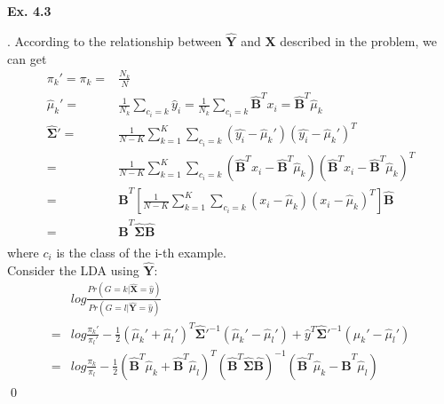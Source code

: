 \documentclass[12pt]{article}
\newenvironment{sol}
  {\par\vspace{3mm}\noindent{\it Solution}.}
  {\qed}
\begin{document}
\\
\\
\\
\\
\\
\\
\\
\\
\\
\\
\\
\\
\begin{flushleft}
\textbf{Ex. 4.3}
\end{flushleft}
\begin{sol}
According to the relationship between $\mathbf{\hat{Y}}$ and $\mathbf{X}$ described in the problem, we can get
\begin{equation*}
\begin{split}
\pi_k'=\pi_k=&\frac{N_k}{N}\\
\hat{\mu}_k'=&\frac{1}{N_k}\sum_{c_i=k}\hat{y}_i=\frac{1}{N_k}\sum_{c_i=k}\hat{\mathbf{B}}^Tx_i=\hat{\mathbf{B}}^T\hat{\mu}_k\\
\hat{\mathbf{\Sigma}}' = &\frac{1}{N-K}\sum_{k=1}^K\sum_{c_i=k}(\hat{y_i}-\hat{\mu}_k')(\hat{y_i}-\hat{\mu}_k')^T\\
=&\frac{1}{N-K}\sum_{k=1}^K\sum_{c_i=k}(\hat{\mathbf{B}}^Tx_i-\hat{\mathbf{B}}^T\hat{\mu}_k)(\hat{\mathbf{B}}^Tx_i-\hat{\mathbf{B}}^T\hat{\mu}_k)^T\\
=&\hat{\mathbf{B}}^T\left[\frac{1}{N-K}\sum_{k=1}^K\sum_{c_i=k}(x_i-\hat{\mu}_k)(x_i-\hat{\mu}_k)^T\right]\hat{\mathbf{B}}\\
=&\hat{\mathbf{B}}^T\hat{\mathbf{\Sigma}}\hat{\mathbf{B}}\\
\end{split}
\end{equation*}
where $c_i$ is the class of the i-th example.\\
Consider the LDA using $\hat{\mathbf{Y}}$:
\begin{equation*}
\begin{split}
&log\frac{Pr(G=k|\hat{\mathbf{X}}=\hat{y})}{Pr(G=l|\hat{\mathbf{Y}}=\hat{y})}\\
=&log\frac{\pi_k'}{\pi_l'}-\frac{1}{2}(\hat{\mu}_k'+\hat{\mu}_l')^T\hat{\mathbf\Sigma}'^{-1}(\hat{\mu}_k'-\hat{\mu}_l')+\hat{y}^T\hat{\mathbf\Sigma}'^{-1}(\hat{\mu}_k'-\hat{\mu}_l')\\
=&log\frac{\pi_k}{\pi_l}-\frac{1}{2}(\hat{\mathbf{B}}^T\hat{\mu}_k+\hat{\mathbf{B}}^T\hat{\mu}_l)^T(\hat{\mathbf{B}}^T\hat{\mathbf\Sigma}\hat{\mathbf{B}})^{-1}(\hat{\mathbf{B}}^T\hat{\mu}_k-\hat{\mathbf{B}}^T\hat{\mu}_l)

\end{split}
\end{equation*}
\end{sol}
\end{document}
